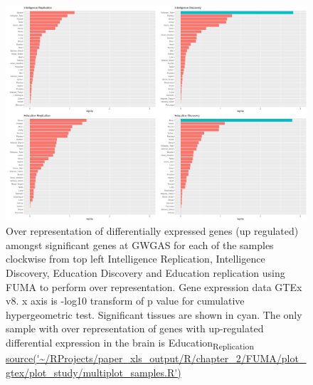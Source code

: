 \begin{figure}
    \centering
    \includegraphics[width=\textwidth]{images/chapter2/ggplot/ggplot_FUMA/Rplot_upregulated_general.png}
    \caption{Over representation of differentially expressed genes (up regulated) amongst significant genes at GWGAS for each of the samples clockwise from top left Intelligence Replication, Intelligence Discovery, Education Discovery and Education replication using FUMA to perform over representation. Gene expression data GTEx v8. x axis is -log10 transform of p value for cumulative hypergeometric test. Significant tissues are shown in cyan. The only sample with over representation of genes with up-regulated differential expression in the brain is Education\textsubscript{Replication} \url{source('~/RProjects/paper_xls_output/R/chapter_2/FUMA/plot_gtex/plot_study/multiplot_samples.R')}}
    \label{fig:deg_upref_sample_gtex_gener}
\end{figure}



